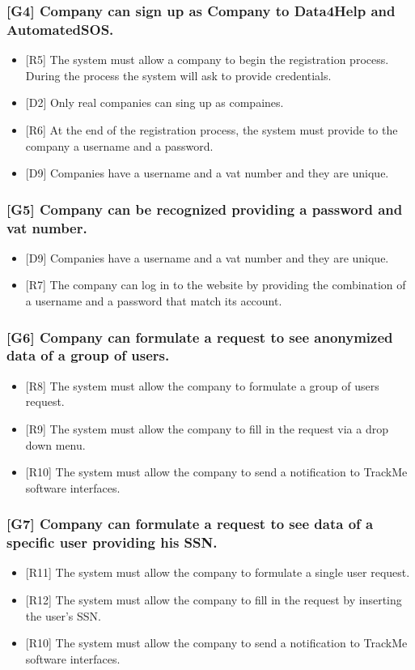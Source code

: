 \documentclass{article}
\begin{document}
\subsubsection{[G4] Company can sign up as Company to Data4Help and AutomatedSOS.}
\begin{itemize}
\item {[R5]} The system must allow a company to begin the registration process. During the process the system will ask to provide credentials.
\item {[D2]} Only real companies can sing up as compaines.
\item {[R6]} At the end of the registration process, the system must provide to the company a username and a password.
\item {[D9]} Companies have a username and a vat number and they are unique.
\end{itemize}
\subsubsection{[G5] Company can be recognized providing a password and vat number.}
\begin{itemize}
\item {[D9]} Companies have a username and a vat number and they are unique.
\item {[R7]} The company can log in to the website by providing the combination of a username and a password that match its account.
\end{itemize}
\subsubsection{[G6] Company can formulate a request to see anonymized data of a group of users.}
\begin{itemize}
\item {[R8]} The system must allow the company to formulate a group of users request.
\item {[R9]} The system must allow the company to fill in the request via a drop down menu.
\item {[R10]} The system must allow the company to send a notification to TrackMe software interfaces.
\end{itemize}
\subsubsection{[G7] Company can formulate a request to see data of a specific user providing his SSN.}
\begin{itemize}
\item {[R11]} The system must allow the company to formulate a single user request.
\item {[R12]} The system must allow the company to fill in the request by inserting the user's SSN.
\item {[R10]} The system must allow the company to send a notification to TrackMe software interfaces.
\end{itemize}
\end{document}
